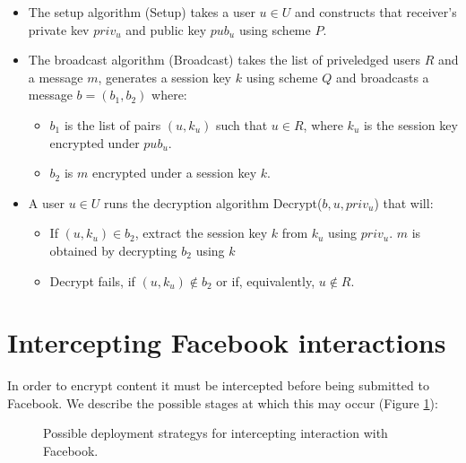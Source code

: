     \begin{itemize}
    
    \item The setup algorithm {\sc (Setup)} takes a user $u \in U$ and constructs that receiver's private kev $priv_u$ and public key $pub_u$ using scheme $P$.
    
    \item The broadcast algorithm {\sc (Broadcast)} takes the list of priveledged users $R$ and a message $m$, generates a session key $k$ using scheme $Q$ and broadcasts a message $b = (b_1,b_2)$ where:
    
    \begin{itemize}
        \item $b_1$ is the list of pairs $(u,k_u)$ such that $u \in R$, where $k_u$ is the session key encrypted under $pub_u$.
        \item $b_2$ is $m$ encrypted under a session key $k$.
    \end{itemize}
    
    
    \item A user $u \in U$ runs the decryption algorithm {\sc Decrypt($b, u, priv_u$)} that will:
    
        \begin{itemize}
            \item If $(u,k_u) \in b_2$, extract the session key $k$ from $k_u$ using $priv_u$. $m$ is obtained by decrypting $b_2$ using $k$
        
            \item {\sc Decrypt} fails, if $(u,k_u) \notin b_2$ or if, equivalently, $u \notin R$.
        
        \end{itemize}

    \end{itemize}
    
    

\section{Intercepting Facebook interactions}

In order to encrypt content it must be intercepted before being submitted to Facebook. We describe the possible stages at which this may occur (Figure \ref{fig:approaches}):

\begin{figure}[tbph]
\begin{center}
    
\caption{Possible deployment strategys for intercepting interaction with Facebook.}
\label{fig:approaches}
\end{center}
\end{figure}


